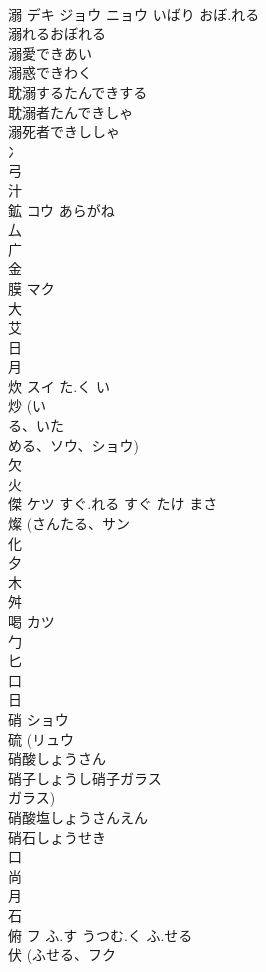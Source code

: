 \documentclass[8pt]{extreport}
\begin{document}
\begin{CJK}{UTF8}{min}
\\	溺	デキ ジョウ ニョウ	いばり おぼ.れる	
\\	溺れるおぼれる 
\\	溺愛できあい 
\\	溺惑できわく 
\\	耽溺するたんできする 
\\	耽溺者たんできしゃ 
\\	溺死者できししゃ 
\\	冫 
\\	弓 
\\	汁 
\\	鉱	コウ	あらがね	
\\	厶 
\\	广 
\\	金 
\\	膜	マク		
\\	大 
\\	艾 
\\	日 
\\	月 
\\	炊	スイ	た.く い	
\\	炒 (い
\\	る、いた
\\	める、ソウ、ショウ) 
\\	欠 
\\	火 
\\	傑	ケツ	すぐ.れる すぐ たけ まさ	
\\	燦 (さんたる、サン 
\\	化 
\\	夕 
\\	木 
\\	舛 
\\	喝	カツ		
\\	勹 
\\	匕 
\\	口 
\\	日 
\\	硝	ショウ		
\\	硫 (リュウ 
\\	硝酸しょうさん
\\	硝子しょうし硝子ガラス
\\	ガラス) 
\\	硝酸塩しょうさんえん
\\	硝石しょうせき
\\	口 
\\	尚 
\\	月 
\\	石 
\\	俯	フ	ふ.す うつむ.く ふ.せる	
\\	伏 (ふせる、フク 

\end{CJK}
\end{document}
